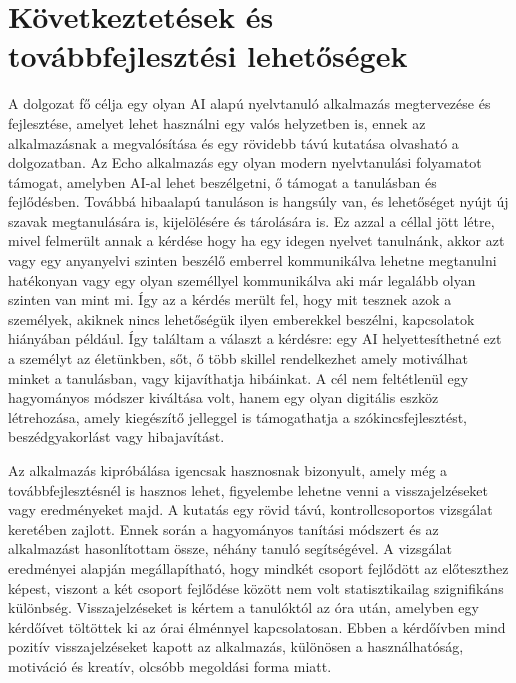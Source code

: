 \chapter{Következtetések és továbbfejlesztési lehetőségek}

A dolgozat fő célja egy olyan AI alapú nyelvtanuló alkalmazás megtervezése és fejlesztése, amelyet lehet használni egy valós helyzetben is, ennek az alkalmazásnak a megvalósítása és egy rövidebb távú kutatása olvasható a dolgozatban. Az Echo alkalmazás egy olyan modern nyelvtanulási folyamatot támogat, amelyben AI-al lehet beszélgetni, ő támogat a tanulásban és fejlődésben. Továbbá hibaalapú tanuláson is hangsúly van, és lehetőséget nyújt új szavak megtanulására is, kijelölésére és tárolására is. Ez azzal a céllal jött létre, mivel felmerült annak a kérdése hogy ha egy idegen nyelvet tanulnánk, akkor azt vagy egy anyanyelvi szinten beszélő emberrel kommunikálva lehetne megtanulni hatékonyan vagy egy olyan személlyel kommunikálva aki már legalább olyan szinten van mint mi. Így az a kérdés merült fel, hogy mit tesznek azok a személyek, akiknek nincs lehetőségük ilyen emberekkel beszélni, kapcsolatok hiányában például. Így találtam a választ a kérdésre: egy AI helyettesíthetné ezt a személyt az életünkben, sőt, ő több skillel rendelkezhet amely motiválhat minket a tanulásban, vagy kijavíthatja hibáinkat. A cél nem feltétlenül egy hagyományos módszer kiváltása volt, hanem egy olyan digitális eszköz létrehozása, amely kiegészítő jelleggel is támogathatja a szókincsfejlesztést, beszédgyakorlást vagy hibajavítást.

Az alkalmazás kipróbálása igencsak hasznosnak bizonyult, amely még a továbbfejlesztésnél is hasznos lehet, figyelembe lehetne venni a visszajelzéseket vagy eredményeket majd. A kutatás egy rövid távú, kontrollcsoportos vizsgálat keretében zajlott. Ennek során a hagyományos tanítási módszert és az alkalmazást hasonlítottam össze, néhány tanuló segítségével. A vizsgálat eredményei alapján megállapítható, hogy mindkét csoport fejlődött az előteszthez képest, viszont a két csoport  fejlődése között nem volt statisztikailag szignifikáns különbség. Visszajelzéseket is kértem a tanulóktól az óra után, amelyben egy kérdőívet töltöttek ki az órai élménnyel kapcsolatosan. Ebben a kérdőívben mind pozitív visszajelzéseket kapott az alkalmazás, különösen a használhatóság, motiváció és kreatív, olcsóbb megoldási forma miatt.

